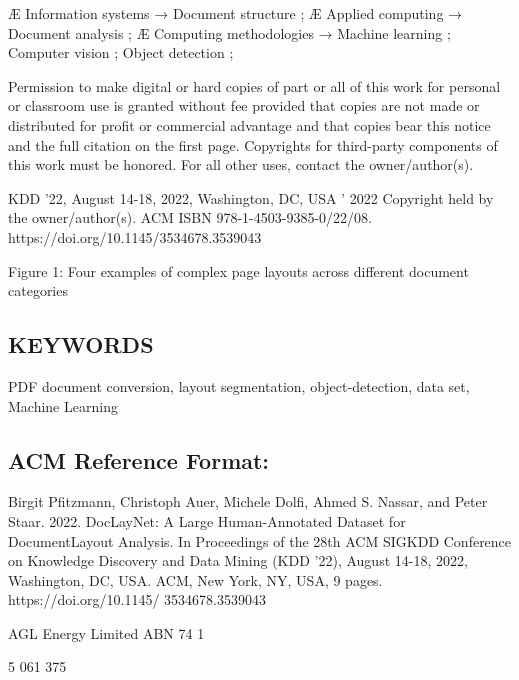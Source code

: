 Æ Information systems → Document structure ; Æ Applied computing → Document analysis ; Æ Computing methodologies → Machine learning ; Computer vision ; Object detection ;

Permission to make digital or hard copies of part or all of this work for personal or classroom use is granted without fee provided that copies are not made or distributed for profit or commercial advantage and that copies bear this notice and the full citation on the first page. Copyrights for third-party components of this work must be honored. For all other uses, contact the owner/author(s).

KDD '22, August 14-18, 2022, Washington, DC, USA ' 2022 Copyright held by the owner/author(s). ACM ISBN 978-1-4503-9385-0/22/08. https://doi.org/10.1145/3534678.3539043

Figure 1: Four examples of complex page layouts across different document categories

\subsection{KEYWORDS}

PDF document conversion, layout segmentation, object-detection, data set, Machine Learning

\subsection{ACM Reference Format:}

Birgit Pfitzmann, Christoph Auer, Michele Dolfi, Ahmed S. Nassar, and Peter Staar. 2022. DocLayNet: A Large Human-Annotated Dataset for DocumentLayout Analysis. In Proceedings of the 28th ACM SIGKDD Conference on Knowledge Discovery and Data Mining (KDD '22), August 14-18, 2022, Washington, DC, USA. ACM, New York, NY, USA, 9 pages. https://doi.org/10.1145/ 3534678.3539043

\begin{figure}[h]
\end{figure}

\begin{figure}[h]
\end{figure}

AGL Energy Limited  ABN 74 1

5 061 375

\begin{figure}[h]
\end{figure}

